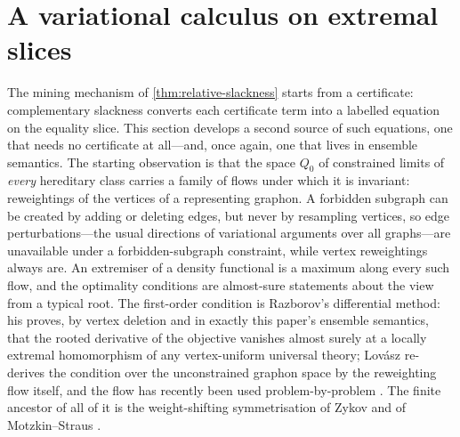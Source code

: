 \documentclass[11pt]{article}
\theoremstyle{definition}
\begin{document}
\section{A variational calculus on extremal slices}\label{sec:variational}

The mining mechanism of \cref{thm:relative-slackness} starts from a certificate:
complementary slackness converts each certificate term into a labelled equation on the
equality slice.  This section develops a second source of such equations, one that needs
no certificate at all---and, once again, one that lives in ensemble semantics.
The starting observation is that the space $Q_0$ of constrained limits of \emph{every}
hereditary class carries a family of flows under which it is invariant: reweightings of
the vertices of a representing graphon.  A forbidden subgraph can be created by adding
or deleting edges, but never by resampling vertices, so edge perturbations---the usual
directions of variational arguments over all graphs---are unavailable under a
forbidden-subgraph constraint, while vertex reweightings always are.  An extremiser of a
density functional is a maximum along every such flow, and the optimality conditions are
almost-sure statements about the view from a typical root.  The first-order condition is
Razborov's differential method: his \cite[Theorem 4.3]{Razborov2007} proves, by vertex
deletion and in exactly this paper's ensemble semantics, that the rooted derivative of
the objective vanishes almost surely at a locally extremal homomorphism of any
vertex-uniform universal theory; Lov\'asz \cite[Lemma 16.5]{Lovasz2012book} re-derives
the condition over the unconstrained graphon space by the reweighting flow itself, and
the flow has recently been used problem-by-problem \cite{LiLiuZhang2026}.  The finite
ancestor of all of it is the weight-shifting symmetrisation of Zykov and of
Motzkin--Straus \cite{Zykov1949,MotzkinStraus}.
\end{document}
